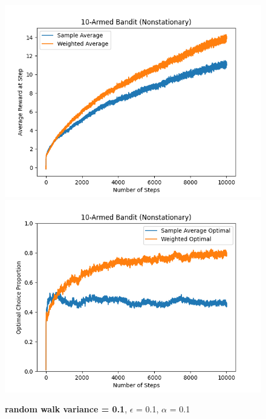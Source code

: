 \documentclass{article}
\begin{document}
\begin{figure}[h!]
\centering
\includegraphics[scale=.6]{RL_A1_pics/rand_walk_var/0.1.png}
\includegraphics[scale=.6]{RL_A1_pics/rand_walk_var/optimal/0.1.png}
\caption{\textbf{random walk variance = 0.1}, $\epsilon$ = 0.1, $\alpha$ = 0.1}
\label{fig:10-Armed1}
\end{figure}
\end{document}
